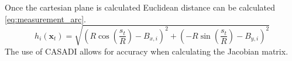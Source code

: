 \noindent Once the cartesian plane is calculated Euclidean distance
can be calculated \eqref{eq:measurement_arc}. 
\begin{equation} \label{eq:measurement_arc}
    h_i(\mathbf{x}_t) = \sqrt{\left( R \cos\left(\frac{s_t}{R}\right) - B_{x,i} \right)^2 + \left( -R \sin\left(\frac{s_t}{R}\right) - B_{y,i} \right)^2}
\end{equation}
The use of CASADI allows for accuracy when calculating the
Jacobian matrix.